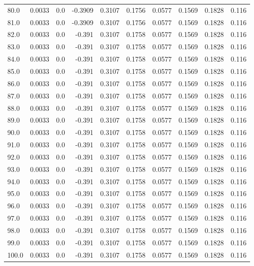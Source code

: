 \begin{longtable}{lrrrrrrrrr}
80.0 & 0.0033 & 0.0 & -0.3909 & 0.3107 & 0.1756 & 0.0577 & 0.1569 & 0.1828 & 0.116 \\
81.0 & 0.0033 & 0.0 & -0.3909 & 0.3107 & 0.1756 & 0.0577 & 0.1569 & 0.1828 & 0.116 \\
82.0 & 0.0033 & 0.0 & -0.391 & 0.3107 & 0.1758 & 0.0577 & 0.1569 & 0.1828 & 0.116 \\
83.0 & 0.0033 & 0.0 & -0.391 & 0.3107 & 0.1758 & 0.0577 & 0.1569 & 0.1828 & 0.116 \\
84.0 & 0.0033 & 0.0 & -0.391 & 0.3107 & 0.1758 & 0.0577 & 0.1569 & 0.1828 & 0.116 \\
85.0 & 0.0033 & 0.0 & -0.391 & 0.3107 & 0.1758 & 0.0577 & 0.1569 & 0.1828 & 0.116 \\
86.0 & 0.0033 & 0.0 & -0.391 & 0.3107 & 0.1758 & 0.0577 & 0.1569 & 0.1828 & 0.116 \\
87.0 & 0.0033 & 0.0 & -0.391 & 0.3107 & 0.1758 & 0.0577 & 0.1569 & 0.1828 & 0.116 \\
88.0 & 0.0033 & 0.0 & -0.391 & 0.3107 & 0.1758 & 0.0577 & 0.1569 & 0.1828 & 0.116 \\
89.0 & 0.0033 & 0.0 & -0.391 & 0.3107 & 0.1758 & 0.0577 & 0.1569 & 0.1828 & 0.116 \\
90.0 & 0.0033 & 0.0 & -0.391 & 0.3107 & 0.1758 & 0.0577 & 0.1569 & 0.1828 & 0.116 \\
91.0 & 0.0033 & 0.0 & -0.391 & 0.3107 & 0.1758 & 0.0577 & 0.1569 & 0.1828 & 0.116 \\
92.0 & 0.0033 & 0.0 & -0.391 & 0.3107 & 0.1758 & 0.0577 & 0.1569 & 0.1828 & 0.116 \\
93.0 & 0.0033 & 0.0 & -0.391 & 0.3107 & 0.1758 & 0.0577 & 0.1569 & 0.1828 & 0.116 \\
94.0 & 0.0033 & 0.0 & -0.391 & 0.3107 & 0.1758 & 0.0577 & 0.1569 & 0.1828 & 0.116 \\
95.0 & 0.0033 & 0.0 & -0.391 & 0.3107 & 0.1758 & 0.0577 & 0.1569 & 0.1828 & 0.116 \\
96.0 & 0.0033 & 0.0 & -0.391 & 0.3107 & 0.1758 & 0.0577 & 0.1569 & 0.1828 & 0.116 \\
97.0 & 0.0033 & 0.0 & -0.391 & 0.3107 & 0.1758 & 0.0577 & 0.1569 & 0.1828 & 0.116 \\
98.0 & 0.0033 & 0.0 & -0.391 & 0.3107 & 0.1758 & 0.0577 & 0.1569 & 0.1828 & 0.116 \\
99.0 & 0.0033 & 0.0 & -0.391 & 0.3107 & 0.1758 & 0.0577 & 0.1569 & 0.1828 & 0.116 \\
100.0 & 0.0033 & 0.0 & -0.391 & 0.3107 & 0.1758 & 0.0577 & 0.1569 & 0.1828 & 0.116 \\

\end{longtable}
